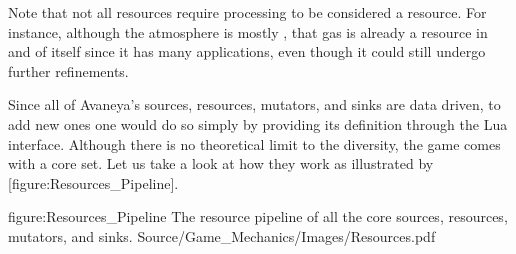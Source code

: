 Note that not all resources require processing to be considered a resource. For instance, although the atmosphere is mostly , that gas is already a resource in and of itself since it has many applications, even though it could still undergo further refinements.

Since all of Avaneya's sources, resources, mutators, and sinks are data driven, to add new ones one would do so simply by providing its definition through the Lua interface. Although there is no theoretical limit to the diversity, the game comes with a core set. Let us take a look at how they work as illustrated by [figure:Resources_Pipeline].

\FullPageDiagram
    {figure:Resources_Pipeline}
    {The resource pipeline of all the core sources, resources, mutators, and sinks.}
    {Source/Game_Mechanics/Images/Resources.pdf}

